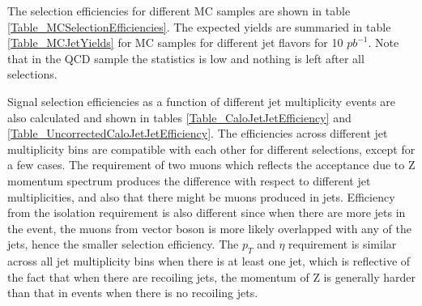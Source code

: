 \documentclass{cmspaper}
\begin{document}
The selection efficiencies for different MC samples are shown in table
\ref{Table_MCSelectionEfficiencies}.  The expected yields are
summaried in table \ref{Table_MCJetYields} for MC samples for
different jet flavors for 10 $pb^{-1}$.  Note that in the QCD sample
the statistics is low and nothing is left after all selections.

Signal selection efficiencies as a function of different jet
multiplicity events are also calculated and shown in tables
\ref{Table_CaloJetJetEfficiency} and
\ref{Table_UncorrectedCaloJetJetEfficiency}.  The efficiencies across
different jet multiplicity bins are compatible with each other for
different selections, except for a few cases.  The requirement of two
muons which reflects the acceptance due to Z momentum spectrum
produces the difference with respect to different jet multiplicities,
and also that there might be muons produced in jets.  Efficiency from
the isolation requirement is also different since when there are more
jets in the event, the muons from vector boson is more likely
overlapped with any of the jets, hence the smaller selection
efficiency.  The $p_T$ and $\eta$ requirement is similar across all
jet multiplicity bins when there is at least one jet, which is
reflective of the fact that when there are recoiling jets, the
momentum of Z is generally harder than that in events when there is no
recoiling jets.
\end{document}
